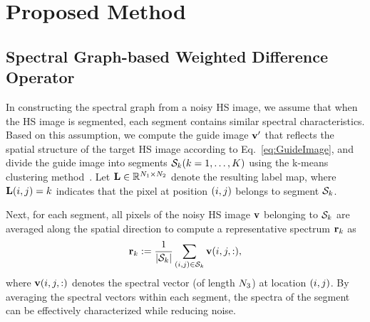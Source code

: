 \section{Proposed Method}
\label{sec:ProposedMethod}



\subsection{Spectral Graph-based Weighted Difference Operator}
\label{subsec:WeightedSpectralDiff}

In constructing the spectral graph from a noisy HS image, we assume that when the HS image is segmented, each segment contains similar spectral characteristics. 
Based on this assumption, we compute the guide image $\mathbf{v}{'}$ that reflects the spatial structure of the target HS image according to Eq.~\eqref{eq:GuideImage}, and divide the guide image into segments $\mathcal{S}_{k} (k = 1, \dots, K)$ using the k-means clustering method~\cite{Arthur2006kmeans}.
Let $\mathbf{L} \in \mathbb{R}^{N_{1} \times N_{2}}$ denote the resulting label map, where $\mathbf{L}(i, j) = k$ indicates that the pixel at position $(i, j)$ belongs to segment $\mathcal{S}_{k}$.

Next, for each segment, all pixels of the noisy HS image $\mathbf{v}$ belonging to $\mathcal{S}_{k}$ are averaged along the spatial direction to compute a representative spectrum $\mathbf{r}_{k}$ as
\begin{equation}
    \label{eq:SpectrumRep}
    \mathbf{r}_{k} := \frac{1}{|\mathcal{S}_{k}|} \sum_{(i, j) \in \mathcal{S}_{k}} \mathbf{v}(i, j, :),
\end{equation}
where $\mathbf{v}(i, j, :)$ denotes the spectral vector (of length $N_{3}$) at location $(i, j)$.
By averaging the spectral vectors within each segment, the spectra of the segment can be effectively characterized while reducing noise.

